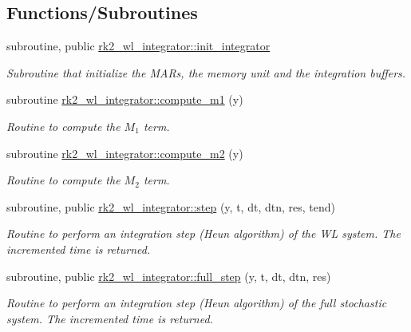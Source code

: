 \subsection*{Functions/\+Subroutines}
\begin{DoxyCompactItemize}
\item 
subroutine, public \hyperlink{namespacerk2__wl__integrator_a1ae65ef720c7776933024a7f884876b4}{rk2\+\_\+wl\+\_\+integrator\+::init\+\_\+integrator}
\begin{DoxyCompactList}\small\item\em Subroutine that initialize the M\+A\+Rs, the memory unit and the integration buffers. \end{DoxyCompactList}\item 
subroutine \hyperlink{namespacerk2__wl__integrator_a9dc90edbd67b31409dcf3b35de448c8b}{rk2\+\_\+wl\+\_\+integrator\+::compute\+\_\+m1} (y)
\begin{DoxyCompactList}\small\item\em Routine to compute the $M_1$ term. \end{DoxyCompactList}\item 
subroutine \hyperlink{namespacerk2__wl__integrator_ac4818fb05d425a8dc74295ec56d16cb4}{rk2\+\_\+wl\+\_\+integrator\+::compute\+\_\+m2} (y)
\begin{DoxyCompactList}\small\item\em Routine to compute the $M_2$ term. \end{DoxyCompactList}\item 
subroutine, public \hyperlink{namespacerk2__wl__integrator_a87232dd593964f76b9cc7f36eeba25a3}{rk2\+\_\+wl\+\_\+integrator\+::step} (y, t, dt, dtn, res, tend)
\begin{DoxyCompactList}\small\item\em Routine to perform an integration step (Heun algorithm) of the WL system. The incremented time is returned. \end{DoxyCompactList}\item 
subroutine, public \hyperlink{namespacerk2__wl__integrator_ac5c14d277e5def9b5dfcaa41fbd0b7ab}{rk2\+\_\+wl\+\_\+integrator\+::full\+\_\+step} (y, t, dt, dtn, res)
\begin{DoxyCompactList}\small\item\em Routine to perform an integration step (Heun algorithm) of the full stochastic system. The incremented time is returned. \end{DoxyCompactList}\end{DoxyCompactItemize}
